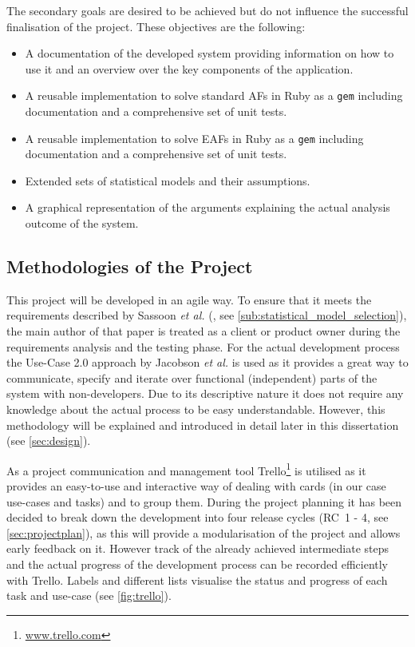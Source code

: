 \bigskip

The secondary goals are desired to be achieved but do not influence the successful finalisation of the project. These objectives are the following:
\begin{itemize}
	\item A documentation of the developed system providing information on how to use it and an overview over the key components of the application.
	\item A reusable implementation to solve standard \glspl{AF} in Ruby as a \texttt{gem} including documentation and a comprehensive set of unit tests.
	\item A reusable implementation to solve \glspl{EAF} in Ruby as a \texttt{gem} including documentation and a comprehensive set of unit tests.
	\item Extended sets of statistical models and their assumptions.
	\item A graphical representation of the arguments explaining the actual analysis outcome of the system.
\end{itemize}


\subsection{Methodologies of the Project}
\label{sub:methodologies}
This project will be developed in an agile way. To ensure that it meets the requirements described by Sassoon \textit{et al.} (\cite{sassoon2014, sassoon2016, sassoon2016CD}, see \autoref{sub:statistical_model_selection}), the main author of that paper is treated as a client or \gls{product owner} during the requirements analysis and the testing phase. For the actual development process the Use-Case 2.0 approach by Jacobson \textit{et al.} \cite{jacobson2011usecase} is used as it provides a great way to communicate, specify and iterate over functional (independent) parts of the system with non-developers. Due to its descriptive nature it does not require any knowledge about the actual process to be easy understandable. However, this methodology will be explained and introduced in detail later in this dissertation (see \autoref{sec:design}). 

As a project communication and management tool Trello\footnote{\href{http://www.trello.com}{www.trello.com}} is utilised as it provides an easy-to-use and interactive way of dealing with cards (in our case use-cases and tasks) and to group them. During the project planning it has been decided to break down the development into  four release cycles (RC~1 - 4, see \autoref{sec:projectplan}), as this will provide a modularisation of the project and allows early feedback on it. However track of the already achieved intermediate steps and the actual progress of the development process can be recorded efficiently with Trello. Labels and different lists visualise the status and progress of each task and use-case (see \autoref{fig:trello}).



